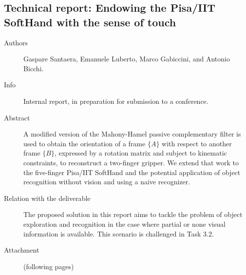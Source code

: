 \documentclass[a4paper,11pt,pdf]{pacmanreport}
\begin{document}
\subsection{Technical report: Endowing the Pisa/IIT SoftHand with the sense of touch} \label{sec:imuSoftHand}
\begin{description}
	\item[Authors] Gaspare Santaera, Emanuele Luberto, Marco Gabiccini, and Antonio Bicchi.
	\item[Info] Internal report, in preparation for submission to a conference.
	\item[Abstract] A modified version of the Mahony-Hamel passive complementary filter is used to obtain the orientation of a frame $\{ A \}$ with respect to another frame $\{ B \}$, expressed by a rotation matrix and subject to kinematic constraints, to reconstruct a two-finger gripper. We extend that work to the five-finger Pisa/IIT SoftHand and the potential application of object recognition without vision and using a naive recognizer.
	\item[Relation with the deliverable] The proposed solution in this report aims to tackle the problem of object exploration and recognition in the case where partial or none visual information is available. This scenario is challenged in Task 3.2.
	\item[Attachment] (following pages)
\end{description}

\end{document}
